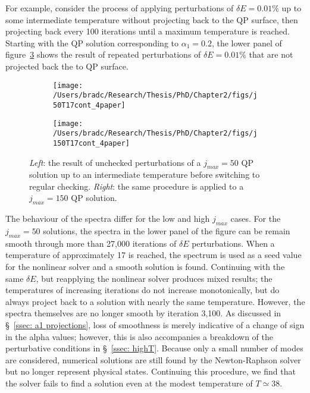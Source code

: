 \documentclass[../PhD.tex]{subfiles}
\begin{document}
\begin{subappendices}
For example, consider the process of applying perturbations of $\delta E = 0.01\%$ up to some intermediate temperature without projecting back to the QP surface, then projecting back every 100 iterations until a maximum temperature is reached. Starting with the QP solution corresponding to $\alpha_1 = 0.2$, the lower panel of figure~\ref{fig: reop check} shows the result of repeated perturbations of $\delta E = 0.01\%$ that are not projected back the to QP surface.

\begin{figure}[h!]
	\centering
	\begin{subfigure}[t]{0.48\textwidth}
		\texttt{[image: /Users/bradc/Research/Thesis/PhD/Chapter2/figs/j50T17cont\_4paper]}
		\label{fig: reop check j50}
	\end{subfigure}
	\;
	\begin{subfigure}[t]{0.48\textwidth}
		\texttt{[image: /Users/bradc/Research/Thesis/PhD/Chapter2/figs/j150T17cont\_4paper]}
		\label{fig: reop check j150}
	\end{subfigure}
\caption[Comparison of spectra and temperatures for different projection frequencies between $j_{max}=50$ and $j_{max} = 150$ solutions]{{\it Left}: the result of unchecked perturbations of a $j_{max} = 50$ QP solution up to an intermediate temperature before switching to regular checking. {\it Right}: the same procedure is applied to a $j_{max}=150$ QP solution.}
\label{fig: reop check}
\end{figure}

The behaviour of the spectra differ for the low and high $j_{max}$ cases. For the $j_{max}=50$ solutions, the spectra in the lower panel of the figure can be remain smooth through more than 27,000 iterations of $\delta E$ perturbations. When a temperature of approximately 17 is reached, the spectrum is used as a seed value for the nonlinear solver and a smooth solution is found. Continuing with the same $\delta E$, but reapplying the nonlinear solver produces mixed results; the temperatures of increasing iterations do not increase monotonically, but do always project back to a solution with nearly the same temperature. However, the spectra themselves are no longer smooth by iteration 3,100. As discussed in \S~\!\ref{ssec: a1 projections}, loss of smoothness is merely indicative of a change of sign in the alpha values; however, this is also accompanies a breakdown of the perturbative conditions in \S\!~\ref{ssec: highT}. Because only a small number of modes are considered, numerical solutions are still found by the Newton-Raphson solver but no longer represent physical states. Continuing this procedure, we find that the solver fails to find a solution even at the modest temperature of $T \simeq 38$.


\end{subappendices}
\end{document}

